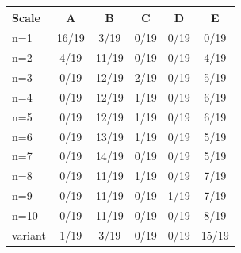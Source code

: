 \begin{tabular}{lccccc}
\toprule
Scale & \cellcolor[HTML]{FFFFFF} A & \cellcolor[HTML]{D55E00} B & \cellcolor[HTML]{E69F00} C & \cellcolor[HTML]{009E73} D & \cellcolor[HTML]{56B4E9} E \\
\midrule
n=1 & \cellcolor[HTML]{FFFFFF} 16/19 & \cellcolor[HTML]{D55E00} 3/19 & \cellcolor[HTML]{E69F00} 0/19 & \cellcolor[HTML]{009E73} 0/19 & \cellcolor[HTML]{56B4E9} 0/19 \\
n=2 & \cellcolor[HTML]{FFFFFF} 4/19 & \cellcolor[HTML]{D55E00} 11/19 & \cellcolor[HTML]{E69F00} 0/19 & \cellcolor[HTML]{009E73} 0/19 & \cellcolor[HTML]{56B4E9} 4/19 \\
n=3 & \cellcolor[HTML]{FFFFFF} 0/19 & \cellcolor[HTML]{D55E00} 12/19 & \cellcolor[HTML]{E69F00} 2/19 & \cellcolor[HTML]{009E73} 0/19 & \cellcolor[HTML]{56B4E9} 5/19 \\
n=4 & \cellcolor[HTML]{FFFFFF} 0/19 & \cellcolor[HTML]{D55E00} 12/19 & \cellcolor[HTML]{E69F00} 1/19 & \cellcolor[HTML]{009E73} 0/19 & \cellcolor[HTML]{56B4E9} 6/19 \\
n=5 & \cellcolor[HTML]{FFFFFF} 0/19 & \cellcolor[HTML]{D55E00} 12/19 & \cellcolor[HTML]{E69F00} 1/19 & \cellcolor[HTML]{009E73} 0/19 & \cellcolor[HTML]{56B4E9} 6/19 \\
n=6 & \cellcolor[HTML]{FFFFFF} 0/19 & \cellcolor[HTML]{D55E00} 13/19 & \cellcolor[HTML]{E69F00} 1/19 & \cellcolor[HTML]{009E73} 0/19 & \cellcolor[HTML]{56B4E9} 5/19 \\
n=7 & \cellcolor[HTML]{FFFFFF} 0/19 & \cellcolor[HTML]{D55E00} 14/19 & \cellcolor[HTML]{E69F00} 0/19 & \cellcolor[HTML]{009E73} 0/19 & \cellcolor[HTML]{56B4E9} 5/19 \\
n=8 & \cellcolor[HTML]{FFFFFF} 0/19 & \cellcolor[HTML]{D55E00} 11/19 & \cellcolor[HTML]{E69F00} 1/19 & \cellcolor[HTML]{009E73} 0/19 & \cellcolor[HTML]{56B4E9} 7/19 \\
n=9 & \cellcolor[HTML]{FFFFFF} 0/19 & \cellcolor[HTML]{D55E00} 11/19 & \cellcolor[HTML]{E69F00} 0/19 & \cellcolor[HTML]{009E73} 1/19 & \cellcolor[HTML]{56B4E9} 7/19 \\
n=10 & \cellcolor[HTML]{FFFFFF} 0/19 & \cellcolor[HTML]{D55E00} 11/19 & \cellcolor[HTML]{E69F00} 0/19 & \cellcolor[HTML]{009E73} 0/19 & \cellcolor[HTML]{56B4E9} 8/19 \\
variant & \cellcolor[HTML]{FFFFFF} 1/19 & \cellcolor[HTML]{D55E00} 3/19 & \cellcolor[HTML]{E69F00} 0/19 & \cellcolor[HTML]{009E73} 0/19 & \cellcolor[HTML]{56B4E9} 15/19 \\
\bottomrule
\end{tabular}
